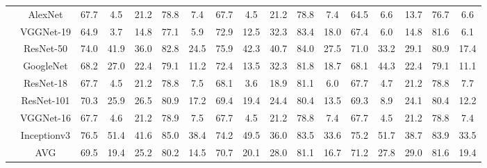 \documentclass[12pt,italian]{article}
\begin{document}
\begin{tiny}
\begin{longtable}{lcccccccccccccccc}
& AlexNet & 67.7 &  4.5 & 21.2 & 78.8 &  7.4 & 67.7 &  4.5 & 21.2 & 78.8 &  7.4 & 64.5 &  6.6 & 13.7 & 76.7 &  6.6 \\ 
& VGGNet-19 & 64.9 &  3.7 & 14.8 & 77.1 &  5.9 & 72.9 & 12.5 & 32.3 & 83.4 & 18.0 & 67.4 &  6.0 & 14.8 & 81.6 &  6.1 \\ 
& ResNet-50 & 74.0 & 41.9 & 36.0 & 82.8 & 24.5 & 75.9 & 42.3 & 40.7 & 84.0 & 27.5 & 71.0 & 33.2 & 29.1 & 80.9 & 17.4 \\ 
& GoogleNet & 68.2 & 27.0 & 22.4 & 79.1 & 11.2 & 72.4 & 13.5 & 32.3 & 81.8 & 18.7 & 68.1 & 44.3 & 22.4 & 79.1 & 11.1 \\ 
& ResNet-18 & 67.7 &  4.5 & 21.2 & 78.8 &  7.5 & 68.1 &  3.6 & 18.9 & 81.1 &  6.0 & 67.7 &  4.7 & 21.2 & 78.8 &  7.7 \\ 
& ResNet-101 & 70.3 & 25.9 & 26.5 & 80.9 & 17.2 & 69.4 & 19.4 & 24.4 & 80.4 & 13.5 & 69.3 &  8.9 & 24.1 & 80.4 & 12.2 \\ 
& VGGNet-16 & 67.7 &  4.6 & 21.2 & 78.9 &  7.5 & 67.7 &  4.5 & 21.2 & 78.8 &  7.4 & 67.7 &  4.5 & 21.2 & 78.8 &  7.4 \\ 
& Inceptionv3 & 76.5 & 51.4 & 41.6 & 85.0 & 38.4 & 74.2 & 49.5 & 36.0 & 83.5 & 33.6 & 75.2 & 51.7 & 38.7 & 83.9 & 33.5 \\ 
\hline
& AVG & 69.5 & 19.4 & 25.2 & 80.2 & 14.5 & 70.7 & 20.1 & 28.0 & 81.1 & 16.7 & 71.2 & 27.8 & 29.0 & 81.6 & 19.4 \\ 
\hline
\bottomrule
\end{longtable} 

 \pagebreak 
\end{tiny} 
 
\end{document}
